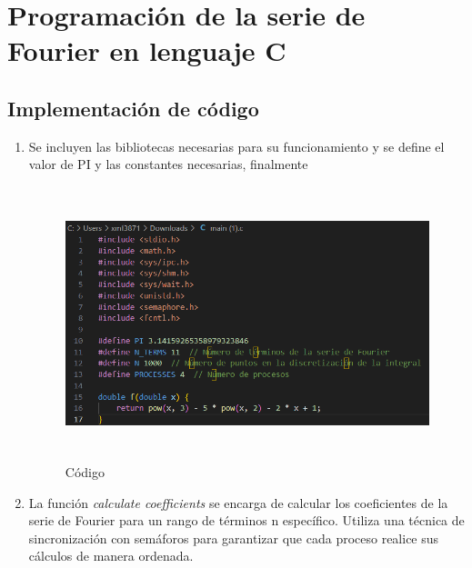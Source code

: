 \section{Programación de la serie de Fourier en lenguaje C}

\subsection{Implementación de código}

\begin{enumerate} 
	\def\labelenumi{\arabic{enumi}.} 
	\item Se incluyen las bibliotecas necesarias para su funcionamiento y se define el valor de PI y las constantes necesarias, finalmente
	
	\begin{figure}[H]
		\centering
		\includegraphics[width=5.55729in,height=3.12944in]{media/image18.png}
		\caption{Código}
	\end{figure}
	
	\item La función \emph{calculate coefficients} se encarga de calcular los coeficientes de la serie de Fourier para un rango de términos n específico. Utiliza una técnica de sincronización con semáforos para garantizar que cada proceso realice sus cálculos de manera ordenada.
	

\end{enumerate}
